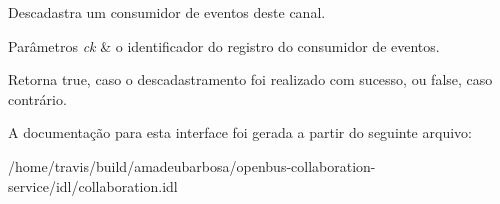 \-Descadastra um consumidor de eventos deste canal. 


\begin{DoxyParams}{\-Parâmetros}
{\em ck} & o identificador do registro do consumidor de eventos. \\
\hline
\end{DoxyParams}
\begin{DoxyReturn}{\-Retorna}
{\ttfamily true}, caso o descadastramento foi realizado com sucesso, ou {\ttfamily false}, caso contrário. 
\end{DoxyReturn}


\-A documentação para esta interface foi gerada a partir do seguinte arquivo\-:\begin{DoxyCompactItemize}
\item 
/home/travis/build/amadeubarbosa/openbus-\/collaboration-\/service/idl/collaboration.\-idl\end{DoxyCompactItemize}

